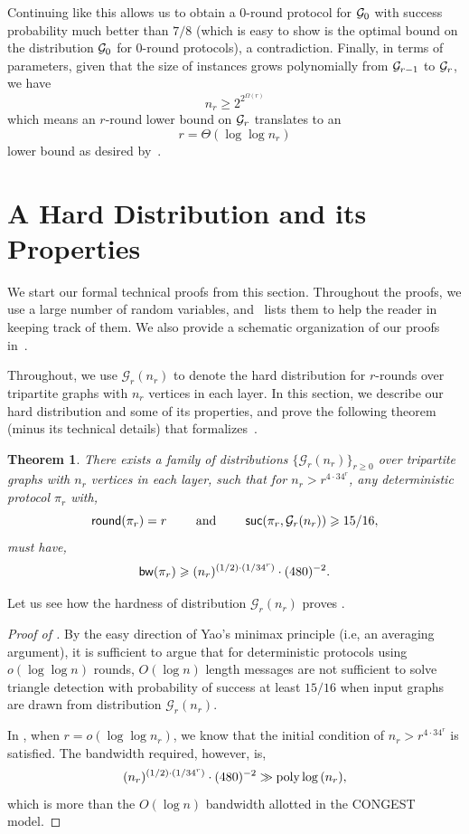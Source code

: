 \documentclass[11pt]{article}
\newtheorem{theorem}{Theorem}
\theoremstyle{definition}
\renewcommand{\geq}{\geqslant}
\newcommand{\poly}{\mbox{\rm poly}}
\newcommand{\prot}{\ensuremath{\pi}}
\newcommand{\suc}{\ensuremath{\textnormal{\textsf{suc}}}}
\newcommand{\round}{\ensuremath{\textnormal{\textsf{round}}}}
\newcommand{\bwidth}{\ensuremath{\textnormal{\textsf{bw}}}}
\newcommand{\cG}{\ensuremath{\mathcal{G}}}
\begin{document}
Continuing like this allows us to obtain a $0$-round protocol for $\mathcal{G}_0$ with success probability much better than $7/8$ (which is easy to show is the optimal bound on the distribution $\mathcal{G}_0$ for $0$-round protocols), a contradiction. 
Finally, in terms of parameters, given that the size of instances grows polynomially from $\mathcal{G}_{r-1}$ to $\mathcal{G}_r$, we have 
\[
n_r \geq 2^{2^{\Omega(r)}}
\]
which means an $r$-round lower bound on $\mathcal{G}_r$ translates to an
\[
r = \Theta(\log\log{n_r})
\]
lower bound as desired by~. 

\clearpage


\section{A Hard Distribution and its Properties}\label{sec:hard-dist}
We start our formal technical proofs from this section. Throughout the proofs, we use a large number of 
 random variables, and~ lists them to help the reader in keeping track of them. 
We also provide a schematic organization of our proofs in~. 

Throughout, we use $\cG_r(n_r)$ to denote the hard distribution for $r$-rounds over tripartite graphs with $n_r$ vertices in each layer. In this section, we describe our hard distribution and some of its properties, 
and prove the following theorem (minus its technical details) that formalizes~. 
\begin{theorem}\label{thm:hard-dist}
	There exists a family of distributions $\{\cG_r(n_r)\}_{r \geq 0}$ over tripartite graphs with $n_r$ vertices in each layer, such that for $n_r > r^{4 \cdot 34^r}$, any deterministic protocol $\prot_r$ with,
	\[
		\round(\prot_r) = r \qquad \textnormal{ and } \qquad \suc(\prot_r, \cG_r(n_r)) \geq 15/16,
	\]
	must have, \[
		\bwidth(\prot_r) \geq (n_r)^{(1/2) \cdot (1/ 34^r)} \cdot (480)^{-2}.
	\]
\end{theorem}

Let us see how the hardness of distribution $\cG_r(n_r)$ proves . 
\begin{proof}[Proof of ]
By the easy direction of Yao's minimax principle (i.e, an averaging argument), it is sufficient to argue that for deterministic protocols using $o(\log \log n)$ rounds, $O(\log n)$ length messages are not sufficient to solve triangle detection with probability of success at least $15/16$ when input graphs are drawn from distribution $\cG_r(n_r)$. 

In , when $r = o(\log \log n_r)$, we know that the initial condition of $n_r > r^{4 \cdot 34^r}$ is satisfied. The bandwidth required, however, is,
\[
	 (n_r)^{(1/2) \cdot (1/ 34^r)} \cdot (480)^{-2} \gg \poly \log{(n_r)}, 
\]
which is more than the $O(\log n)$ bandwidth allotted in the CONGEST model.
\end{proof}
\end{document}
